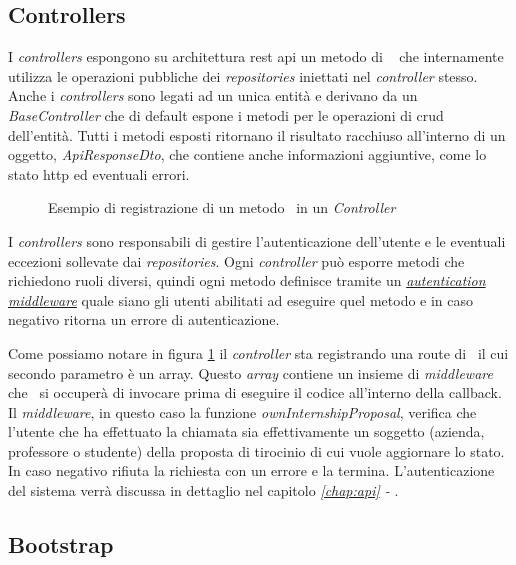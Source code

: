 \pagebreak
\subsection{Controllers}
\label{server:controllers}
I \textit{controllers} espongono su architettura \acrshort{rest} \acrshort{api} un metodo di \expressjs~ che internamente utilizza le operazioni pubbliche dei \textit{repositories} iniettati nel \textit{controller} stesso. Anche i \textit{controllers} sono legati ad un unica entità e derivano da un \textit{BaseController} che di default espone i metodi per le operazioni di \acrshort{crud} dell'entità. 
Tutti i metodi esposti ritornano il risultato racchiuso all'interno di un oggetto, \textit{ApiResponseDto}, che contiene anche informazioni aggiuntive, come lo stato \acrshort{http} ed eventuali errori.

\begin{figure}[H] 
	\centering    
	
	\caption[Esempio di registrazione di un metodo \expressjs~in un \textit{Controller}]{Esempio di registrazione di un metodo \expressjs~in un \textit{Controller}}
	\label{fig:server-controller-1}
\end{figure}
\noindent
I \textit{controllers} sono responsabili di gestire l'autenticazione dell'utente e le eventuali eccezioni sollevate dai \textit{repositories}. Ogni \textit{controller} può esporre metodi che richiedono ruoli diversi, quindi ogni metodo definisce tramite un \textit{\hyperref[chap:auth-backend]{autentication middleware}} quale siano gli utenti abilitati ad eseguire quel metodo e in caso negativo ritorna un errore di autenticazione.

\noindent
Come possiamo notare in figura \ref{fig:server-controller-1} il \textit{controller} sta registrando una route di \expressjs~il cui  secondo parametro è un array. Questo \textit{array} contiene un insieme di \textit{middleware} che \expressjs~si occuperà di invocare prima di eseguire il codice all'interno della \gls{callback}. Il \textit{middleware}, in questo caso la funzione \textit{ownInternshipProposal}, verifica che l'utente che ha effettuato la chiamata sia effettivamente un soggetto (azienda, professore o studente) della proposta di tirocinio di cui vuole aggiornare lo stato. In caso negativo rifiuta la richiesta con un errore e la termina. L'autenticazione del sistema verrà discussa in dettaglio nel capitolo \textit{\ref{chap:api} - }.

\pagebreak
\subsection{Bootstrap}

